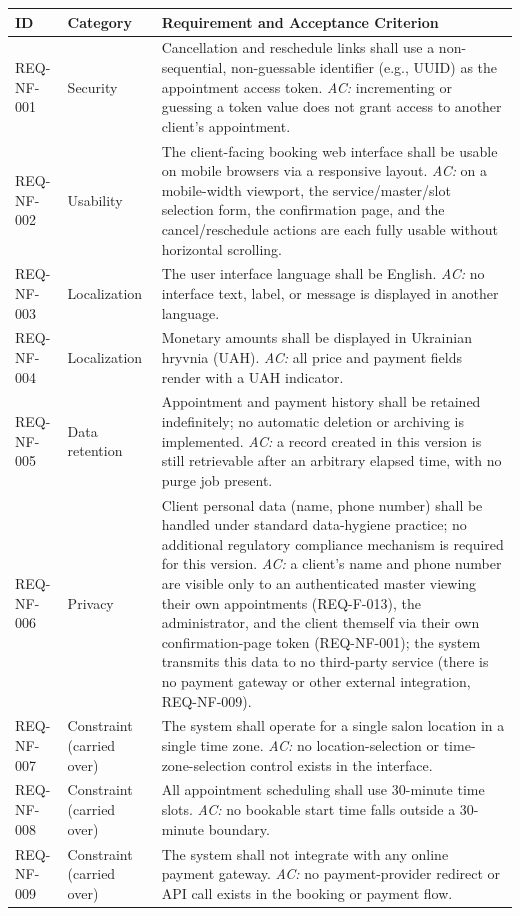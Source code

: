 \documentclass[11pt,a4paper]{article}
\begin{document}
\begin{longtable}{L{1.9cm}L{2.6cm}L{9.9cm}}
\toprule
ID & Category & Requirement and Acceptance Criterion \\
\midrule
\endhead
REQ-NF-001 & Security & Cancellation and reschedule links shall use a
  non-sequential, non-guessable identifier (e.g., UUID) as the appointment
  access token. \emph{AC:} incrementing or guessing a token value does not
  grant access to another client's appointment. \\
REQ-NF-002 & Usability & The client-facing booking web interface shall be
  usable on mobile browsers via a responsive layout. \emph{AC:} on a
  mobile-width viewport, the service/master/slot selection form, the
  confirmation page, and the cancel/reschedule actions are each fully
  usable without horizontal scrolling. \\
REQ-NF-003 & Localization & The user interface language shall be English.
  \emph{AC:} no interface text, label, or message is displayed in another
  language. \\
REQ-NF-004 & Localization & Monetary amounts shall be displayed in
  Ukrainian hryvnia (UAH). \emph{AC:} all price and payment fields render
  with a UAH indicator. \\
REQ-NF-005 & Data retention & Appointment and payment history shall be
  retained indefinitely; no automatic deletion or archiving is implemented.
  \emph{AC:} a record created in this version is still retrievable after
  an arbitrary elapsed time, with no purge job present. \\
REQ-NF-006 & Privacy & Client personal data (name, phone number) shall be
  handled under standard data-hygiene practice; no additional regulatory
  compliance mechanism is required for this version. \emph{AC:} a client's
  name and phone number are visible only to an authenticated master
  viewing their own appointments (REQ-F-013), the administrator, and the
  client themself via their own confirmation-page token (REQ-NF-001); the
  system transmits this data to no third-party service (there is no
  payment gateway or other external integration, REQ-NF-009). \\
REQ-NF-007 & Constraint (carried over) & The system shall operate for a
  single salon location in a single time zone. \emph{AC:} no
  location-selection or time-zone-selection control exists in the
  interface. \\
REQ-NF-008 & Constraint (carried over) & All appointment scheduling shall
  use 30-minute time slots. \emph{AC:} no bookable start time falls outside
  a 30-minute boundary. \\
REQ-NF-009 & Constraint (carried over) & The system shall not integrate
  with any online payment gateway. \emph{AC:} no payment-provider redirect
  or API call exists in the booking or payment flow. \\
\bottomrule
\end{longtable}
\end{document}
